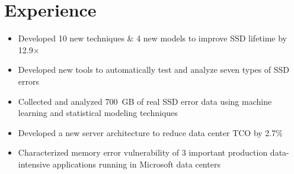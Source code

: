 \documentclass[]{resume}
\begin{document}
\begin{minipage}[t]{0.613\textwidth}


\section{Experience}
\begin{itemize}[topsep=0pt,partopsep=0pt,noitemsep,leftmargin=10pt]
\item Developed 10 new techniques \& 4 new models to improve SSD lifetime by 12.9$\times$
\item Developed new tools to automatically test and analyze seven types of SSD errors
\item Collected and analyzed 700~GB of real SSD error data using machine learning and statistical modeling techniques
\end{itemize}
\sectionsep%

\begin{itemize}[topsep=0pt,partopsep=0pt,noitemsep,leftmargin=10pt]
\item Developed a new server architecture to reduce data center TCO by 2.7\%
\item Characterized memory error vulnerability of 3 important production data-intensive applications running in Microsoft data centers
\end{itemize}




\end{minipage}
\end{document}
